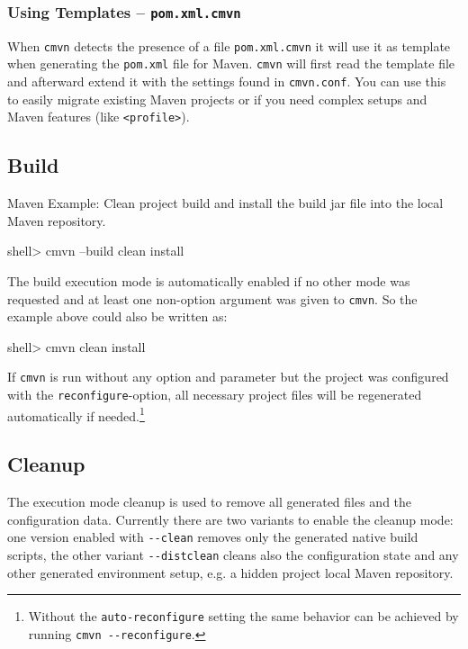 \documentclass[a4paper,12pt,english,oneside,halfparskip]{scrartcl}
\newcommand{\CMVN}{\texttt{cmvn}}
\newcommand{\cmvn}{\texttt{cmvn}}
\newcommand{\code}[1]{\texttt{#1}}
\newcommand{\pom}{\code{pom.xml}}
\newcommand{\cmdoption}[1]{\code{-{}-#1}}
\begin{document}
\subsubsection{Using Templates -- \code{pom.xml.cmvn}}

When \cmvn{} detects the presence of a file \code{pom.xml.cmvn} it will use it as template when generating the \pom{} file for Maven. \cmvn{} will first read the template file and afterward extend it with the settings found in \code{cmvn.conf}. You can use this to easily migrate existing Maven projects or if you need complex setups and Maven features (like \code{<profile>}). 


\subsection{Build}

Maven Example: Clean project build and install the build jar file into the local Maven repository.

\begin{Cmdline}
shell> cmvn --build clean install
\end{Cmdline}

The build execution mode is automatically enabled if no other mode was requested and at least one non-option argument was given to \CMVN{}. So the example above could also be written as:

\begin{Cmdline}
shell> cmvn clean install
\end{Cmdline}

If \cmvn{} is run without any option and parameter but the project was configured with the \code{reconfigure}-option, all necessary project files will be regenerated automatically if needed.\footnote{Without the \code{auto-reconfigure} setting the same behavior can be achieved by running \code{cmvn -{}-reconfigure}.}



\subsection{Cleanup}

The execution mode cleanup is used to remove all generated files and the configuration data. Currently there are two variants to enable the cleanup mode: one version enabled with \cmdoption{clean} removes only the generated native build scripts, the other variant \cmdoption{distclean} cleans also the configuration state and any other generated environment setup, e.g. a hidden project local Maven repository.
\end{document}
